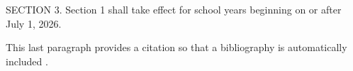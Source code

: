 \documentclass[11pt]{article}%
\begin{document}
\begin{multicols}{2}
\begin{sidebarquote}
[...]

SECTION 3. Section 1 shall take effect for school years beginning on or after July 1, 2026.
\end{sidebarquote}


This last paragraph provides a citation so that a bibliography is
automatically included \cite{book:algorithms-4th-ed}.

\printbibliography %


\end{multicols}
\end{document}
